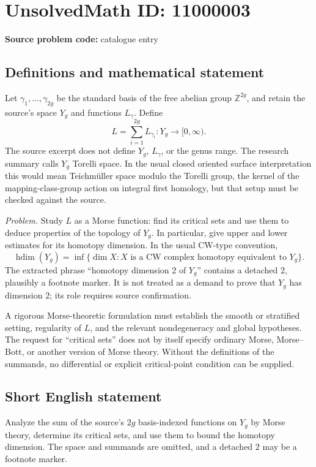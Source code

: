 \documentclass[11pt]{article}
\newcommand{\Z}{\mathbb{Z}}
\begin{document}
\section*{UnsolvedMath ID: 11000003}
\textbf{Source problem code:} catalogue entry
\subsection{Definitions and mathematical statement}
Let \(\gamma_1,\ldots,\gamma_{2g}\) be the standard basis of the free abelian group \(\Z^{2g}\), and retain the source's space \(Y_g\) and functions \(L_\gamma\). Define
\[
 L=\sum_{i=1}^{2g}L_{\gamma_i}:Y_g\longrightarrow[0,\infty).
\]
The source excerpt does not define \(Y_g\), \(L_\gamma\), or the genus range. The research summary calls \(Y_g\) Torelli space. In the usual closed oriented surface interpretation this would mean Teichm\"uller space modulo the Torelli group, the kernel of the mapping-class-group action on integral first homology, but that setup must be checked against the source.

\emph{Problem.} Study \(L\) as a Morse function: find its critical sets and use them to deduce properties of the topology of \(Y_g\). In particular, give upper and lower estimates for its homotopy dimension. In the usual CW-type convention,
\[
 \operatorname{hdim}(Y_g)
 =\inf\{\dim X:X\text{ is a CW complex homotopy equivalent to }Y_g\}.
\]
The extracted phrase ``homotopy dimension 2 of \(Y_g\)'' contains a detached \(2\), plausibly a footnote marker. It is not treated as a demand to prove that \(Y_g\) has dimension \(2\); its role requires source confirmation.

A rigorous Morse-theoretic formulation must establish the smooth or stratified setting, regularity of \(L\), and the relevant nondegeneracy and global hypotheses. The request for ``critical sets'' does not by itself specify ordinary Morse, Morse--Bott, or another version of Morse theory. Without the definitions of the summands, no differential or explicit critical-point condition can be supplied.
\subsection{Short English statement}
Analyze the sum of the source's \(2g\) basis-indexed functions on \(Y_g\) by Morse theory, determine its critical sets, and use them to bound the homotopy dimension. The space and summands are omitted, and a detached \(2\) may be a footnote marker.
\end{document}
